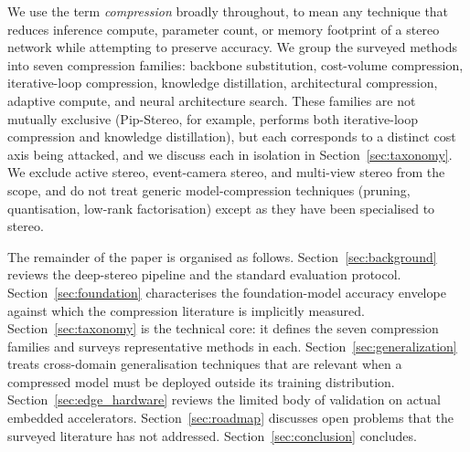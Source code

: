 We use the term \emph{compression} broadly throughout, to mean any technique that reduces inference compute, parameter count, or memory footprint of a stereo network while attempting to preserve accuracy. We group the surveyed methods into seven compression families: backbone substitution, cost-volume compression, iterative-loop compression, knowledge distillation, architectural compression, adaptive compute, and neural architecture search. These families are not mutually exclusive (Pip-Stereo, for example, performs both iterative-loop compression and knowledge distillation), but each corresponds to a distinct cost axis being attacked, and we discuss each in isolation in Section~\ref{sec:taxonomy}. We exclude active stereo, event-camera stereo, and multi-view stereo from the scope, and do not treat generic model-compression techniques (pruning, quantisation, low-rank factorisation) except as they have been specialised to stereo.

The remainder of the paper is organised as follows. Section~\ref{sec:background} reviews the deep-stereo pipeline and the standard evaluation protocol. Section~\ref{sec:foundation} characterises the foundation-model accuracy envelope against which the compression literature is implicitly measured. Section~\ref{sec:taxonomy} is the technical core: it defines the seven compression families and surveys representative methods in each. Section~\ref{sec:generalization} treats cross-domain generalisation techniques that are relevant when a compressed model must be deployed outside its training distribution. Section~\ref{sec:edge_hardware} reviews the limited body of validation on actual embedded accelerators. Section~\ref{sec:roadmap} discusses open problems that the surveyed literature has not addressed. Section~\ref{sec:conclusion} concludes.
